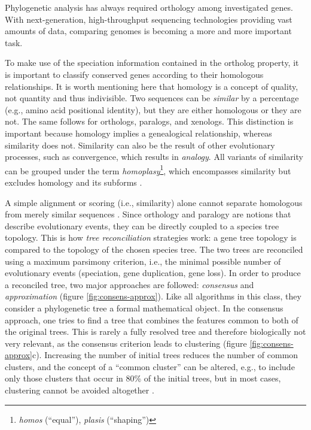 Phylogenetic analysis has always required orthology among investigated genes.
With next-generation, high-throughput sequencing technologies providing vast
amounts of data, comparing genomes is becoming a more and more important task. 

To make use of the speciation information contained in the ortholog property, it
is important to classify conserved genes according to their homologous
relationships. It is worth mentioning here that homology is a concept of
quality, not quantity \citep{reeck1987} and thus indivisible. Two sequences can
be \emph{similar} by a percentage (e.g., amino acid positional identity), but
they are either homologous or they are not. The same follows for orthologs,
paralogs, and xenologs. This distinction is important because homology implies a
genealogical relationship, whereas similarity does not. Similarity can also be
the result of other evolutionary processes, such as convergence, which results
in \emph{analogy}. All variants of similarity can be grouped under the term
\emph{homoplasy}\footnote{\emph{homos} (``equal''), \emph{plasis}
(``shaping'')}, which encompasses similarity but excludes homology and its
subforms \citep{page1998}.

A simple alignment or scoring (i.e., similarity) alone cannot separate
homologous from merely similar sequences \citep{eisen1998}. Since orthology and
paralogy are notions that describe evolutionary events, they can be directly
coupled to a species tree topology. This is how \emph{tree reconciliation}
strategies work: a gene tree topology is compared to the topology of the chosen
species tree. The two trees are reconciled using a maximum parsimony criterion,
i.e., the minimal possible number of evolutionary events (speciation, gene
duplication, gene loss). In order to produce a reconciled tree, two major
approaches are followed: \emph{consensus} and \emph{approximation} (figure
\ref{fig:consens-approx}). Like all algorithms in this class, they consider a
phylogenetic tree a formal mathematical object. In the consensus approach, one
tries to find a tree that combines the features common to both of the original
trees. This is rarely a fully resolved tree and therefore biologically not very
relevant, as the consensus criterion leads to clustering (figure
\ref{fig:consens-approx}c). Increasing the number of initial trees reduces the
number of common clusters, and the concept of a ``common cluster'' can be
altered, e.g., to include only those clusters that occur in 80\% of the initial
trees, but in most cases, clustering cannot be avoided altogether
\citep{mirkin1995}.

